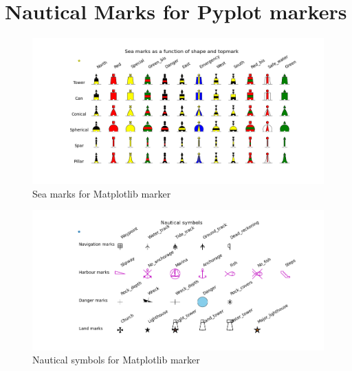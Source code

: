\documentclass{beamer}
\begin{document}
\section{Nautical Marks for Pyplot markers }
\begin{frame}
    \begin{figure}[l]
    \centering
    \includegraphics[width=12cm]{./pictures/marker1.png}
    \caption{Sea marks for Matplotlib marker  }
    \end{figure}
\end{frame}


\begin{frame}
    \begin{figure}[h]
    \centering
    \includegraphics[width=12cm]{./pictures/marker2.png}
    \caption{Nautical symbols for Matplotlib marker  }
    \end{figure}

\end{frame}
\end{document}
